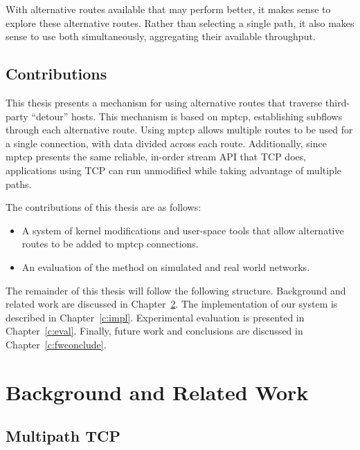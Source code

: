 \documentclass{cwru}
\begin{document}
With alternative routes available that may perform better, it makes sense to
explore these alternative routes. Rather than selecting a single path, it also
makes sense to use both simultaneously, aggregating their available throughput.

\section{Contributions}

This thesis presents a mechanism for using alternative routes that traverse
third-party ``detour'' hosts. This mechanism is based on \ac{mptcp},
establishing subflows through each alternative route. Using \ac{mptcp} allows
multiple routes to be used for a single connection, with data divided across
each route. Additionally, since \ac{mptcp} presents the same reliable, in-order
stream API that TCP does, applications using TCP can run unmodified while taking
advantage of multiple paths.

The contributions of this thesis are as follows:
\begin{itemize}
\item A system of kernel modifications and user-space tools that allow
  alternative routes to be added to \ac{mptcp} connections.
\item An evaluation of the method on simulated and real world networks.
\end{itemize}

The remainder of this thesis will follow the following structure. Background and
related work are discussed in Chapter~\ref{c:bgrw}. The implementation of our
system is described in Chapter~\ref{c:impl}. Experimental evaluation is
presented in Chapter~\ref{c:eval}. Finally, future work and conclusions are
discussed in Chapter~\ref{c:fwconclude}.

\chapter{Background and Related Work}
\label{c:bgrw}

\section{Multipath TCP}
\end{document}
